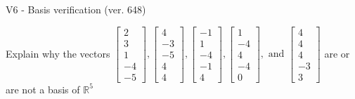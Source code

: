 \begin{exercise}
  \begin{exerciseTitle}V6 - Basis verification (ver. 648)\end{exerciseTitle}
  \begin{exerciseStatement}
    Explain why the vectors \(\left[\begin{array}{r}
2 \\
3 \\
1 \\
-4 \\
-5
\end{array}\right] , \left[\begin{array}{r}
4 \\
-3 \\
-5 \\
4 \\
4
\end{array}\right] , \left[\begin{array}{r}
-1 \\
1 \\
-4 \\
-1 \\
4
\end{array}\right] , \left[\begin{array}{r}
1 \\
-4 \\
4 \\
-4 \\
0
\end{array}\right] , \text{ and } \left[\begin{array}{r}
4 \\
4 \\
4 \\
-3 \\
3
\end{array}\right]\) are or are not a basis of \(\mathbb{R}^5\)	



\end{exerciseStatement}
\end{exercise}

